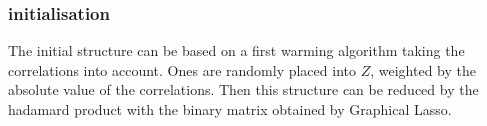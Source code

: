 \documentclass[11pt,a4paper]{article}
\begin{document}
%	
%	
			

 \subsubsection{initialisation}
The initial structure can be based on a first warming algorithm taking the correlations into account. Ones are randomly placed into $Z$, weighted by the absolute value of the correlations. Then this structure can be reduced by the hadamard product with the binary matrix obtained by Graphical Lasso\cite{friedman2008sparse}.		
\end{document}
